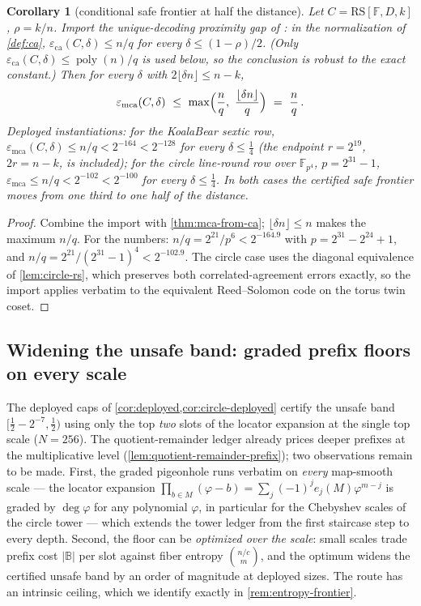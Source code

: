 \documentclass[11pt]{article}
\newtheorem{corollary}[corollary]{Corollary}
\theoremstyle{definition}
\theoremstyle{remark}
\newcommand{\F}{\mathbb{F}}
\newcommand{\B}{\mathbb{B}}
\newcommand{\RS}{\mathrm{RS}}
\newcommand{\eca}{\varepsilon_{\mathrm{ca}}}
\newcommand{\emca}{\varepsilon_{\mathrm{mca}}}
\begin{document}
\begin{corollary}[conditional safe frontier at half the distance]\label{cor:conditional-half}
Let $C=\RS[\F,D,k]$, $\rho=k/n$. Import the unique-decoding proximity gap of \cite[Thm.~4.1]{BCIKS20}: in the normalization of \cref{def:ca}, $\eca(C,\delta)\le n/q$ for every $\delta\le(1-\rho)/2$. (Only $\eca(C,\delta)\le\operatorname{poly}(n)/q$ is used below, so the conclusion is robust to the exact constant.) Then for every $\delta$ with $2\lfloor\delta n\rfloor\le n-k$,
\[
\emca(C,\delta)\ \le\ \max\Bigl(\frac nq,\ \frac{\lfloor\delta n\rfloor}q\Bigr)\ =\ \frac nq\,.
\]
Deployed instantiations: for the KoalaBear sextic row, $\emca(C,\delta)\le n/q<2^{-164}<2^{-128}$ for every $\delta\le\tfrac14$ (the endpoint $r=2^{19}$, $2r=n-k$, is included); for the circle line-round row over $\F_{p^4}$, $p=2^{31}-1$, $\emca\le n/q<2^{-102}<2^{-100}$ for every $\delta\le\tfrac14$. In both cases the certified safe frontier moves from one third to one half of the distance.
\end{corollary}

\begin{proof}
Combine the import with \cref{thm:mca-from-ca}; $\lfloor\delta n\rfloor\le n$ makes the maximum $n/q$. For the numbers: $n/q=2^{21}/p^6<2^{-164.9}$ with $p=2^{31}-2^{24}+1$, and $n/q=2^{21}/(2^{31}-1)^4<2^{-102.9}$. The circle case uses the diagonal equivalence of \cref{lem:circle-rs}, which preserves both correlated-agreement errors exactly, so the import applies verbatim to the equivalent Reed--Solomon code on the torus twin coset.
\end{proof}

\subsection{Widening the unsafe band: graded prefix floors on every scale}\label{sec:pincer-floors}

The deployed caps of \cref{cor:deployed,cor:circle-deployed} certify the unsafe band $[\tfrac12-2^{-7},\tfrac12)$ using only the top \emph{two} slots of the locator expansion at the single top scale ($N=256$). The quotient-remainder ledger already prices deeper prefixes at the multiplicative level (\cref{lem:quotient-remainder-prefix}); two observations remain to be made. First, the graded pigeonhole runs verbatim on \emph{every} map-smooth scale --- the locator expansion $\prod_{b\in M}(\varphi-b)=\sum_j(-1)^je_j(M)\varphi^{m-j}$ is graded by $\deg\varphi$ for any polynomial $\varphi$, in particular for the Chebyshev scales of the circle tower --- which extends the tower ledger from the first staircase step to every depth. Second, the floor can be \emph{optimized over the scale}: small scales trade prefix cost $|\B|$ per slot against fiber entropy $\binom{n/c}{m}$, and the optimum widens the certified unsafe band by an order of magnitude at deployed sizes. The route has an intrinsic ceiling, which we identify exactly in \cref{rem:entropy-frontier}.
\end{document}

